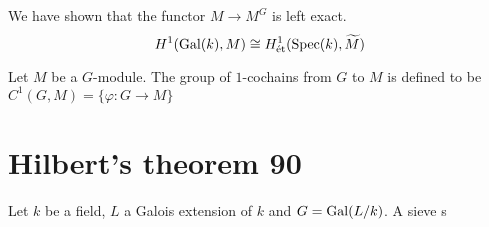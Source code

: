 We have shown that the functor $M \to M^G$ is left exact.
\[H^1(\operatorname{Gal}(k),M) \cong H_\text{\text{\'et}}^1(\operatorname{Spec}(k), \widetilde{M})\]

\begin{definition}
	Let $M$ be a $G$-module. The group of $1$-cochains from $G$ to $M$ is defined to be  $C^1(G, M) = \{\varphi: G \to M\}$
\end{definition}

\section{Hilbert's theorem 90}
Let $k$ be a field, $L$ a Galois extension of $k$ and $G = \operatorname{Gal}(L/k)$. A sieve s
